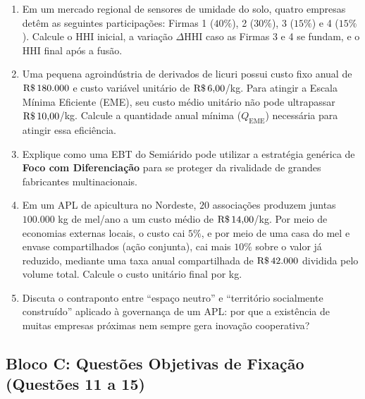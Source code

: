 \begin{enumerate}[leftmargin=1.6em, itemsep=6pt, resume]
  \item Em um mercado regional de sensores de umidade do solo, quatro empresas detêm as seguintes participações: Firmas 1 ($40\%$), 2 ($30\%$), 3 ($15\%$) e 4 ($15\%$). Calcule o $\text{HHI}$ inicial, a variação $\Delta \text{HHI}$ caso as Firmas 3 e 4 se fundam, e o $\text{HHI}$ final após a fusão.
  \espacoResolucao[2.2cm]

  \item Uma pequena agroindústria de derivados de licuri possui custo fixo anual de $\text{R\$\,}{180.000}$ e custo variável unitário de $\text{R\$\,}{6{,}00}$/kg. Para atingir a Escala Mínima Eficiente (EME), seu custo médio unitário não pode ultrapassar $\text{R\$\,}{10{,}00}$/kg. Calcule a quantidade anual mínima ($Q_{\text{EME}}$) necessária para atingir essa eficiência.
  \espacoResolucao[2.2cm]

  \item Explique como uma EBT do Semiárido pode utilizar a estratégia genérica de \textbf{Foco com Diferenciação} para se proteger da rivalidade de grandes fabricantes multinacionais.
  \espacoResolucao[2.0cm]

  \item Em um APL de apicultura no Nordeste, $20$ associações produzem juntas $100.000$ kg de mel/ano a um custo médio de $\text{R\$\,}{14{,}00}$/kg. Por meio de economias externas locais, o custo cai $5\%$, e por meio de uma casa do mel e envase compartilhados (ação conjunta), cai mais $10\%$ sobre o valor já reduzido, mediante uma taxa anual compartilhada de $\text{R\$\,}{42.000}$ dividida pelo volume total. Calcule o custo unitário final por kg.
  \espacoResolucao[2.2cm]

  \item Discuta o contraponto entre ``espaço neutro'' e ``território socialmente construído'' aplicado à governança de um APL: por que a existência de muitas empresas próximas nem sempre gera inovação cooperativa?
  \espacoResolucao[2.0cm]
\end{enumerate}

\subsection*{Bloco C: Questões Objetivas de Fixação (Questões 11 a 15)}

